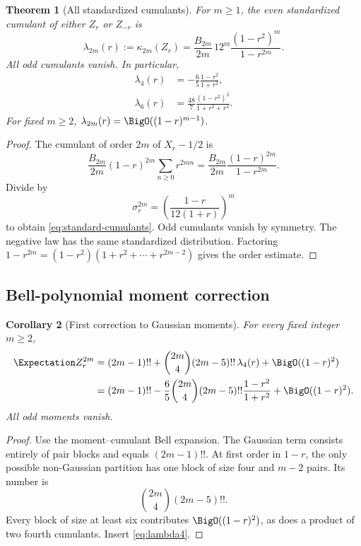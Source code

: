 \documentclass[11pt]{article}
\newtheorem{theorem}{Theorem}[section]
\newtheorem{corollary}[theorem]{Corollary}
\theoremstyle{definition}
\newcommand{\cump}{\kappa}
\begin{document}
\begin{theorem}[All standardized cumulants]\label{thm:standard-cumulants}
For \(m\ge1\), the even standardized cumulant of either \(Z_r\) or \(Z_{-r}\) is
\begin{equation}
 \boxed{
 \lambda_{2m}(r):=\cump_{2m}(Z_r)
 =\frac{B_{2m}}{2m}\,12^m
 \frac{(1-r^2)^m}{1-r^{2m}}.}                             \label{eq:standard-cumulants}
\end{equation}
All odd cumulants vanish.  In particular,
\begin{align}
 \lambda_4(r)&=-\frac65\frac{1-r^2}{1+r^2},              \label{eq:lambda4}\\
 \lambda_6(r)&=\frac{48}{7}
 \frac{(1-r^2)^2}{1+r^2+r^4}.                            \label{eq:lambda6}
\end{align}
For fixed \(m\ge2\), \(\lambda_{2m}(r)=\BigO((1-r)^{m-1})\).
\end{theorem}

\begin{proof}
The cumulant of order \(2m\) of \(X_r-1/2\) is
\[
 \frac{B_{2m}}{2m}(1-r)^{2m}\sum_{n\ge0}r^{2mn}
 =\frac{B_{2m}}{2m}\frac{(1-r)^{2m}}{1-r^{2m}}.
\]
Divide by
\[
 \sigma_r^{2m}=\left(\frac{1-r}{12(1+r)}\right)^m
\]
to obtain \cref{eq:standard-cumulants}.  Odd cumulants vanish by symmetry.  The
negative law has the same standardized distribution.  Factoring
\(1-r^{2m}=(1-r^2)(1+r^2+\cdots+r^{2m-2})\) gives the order estimate.
\end{proof}

\subsection{Bell-polynomial moment correction}

\begin{corollary}[First correction to Gaussian moments]\label{cor:moment-correction}
For every fixed integer \(m\ge2\),
\begin{align}
 \Expectation Z_r^{2m}
 &=(2m-1)!!
 +\binom{2m}{4}(2m-5)!!\,\lambda_4(r)
 +\BigO((1-r)^2)                                          \label{eq:moment-correction-1}\\
 &=(2m-1)!!
 -\frac65\binom{2m}{4}(2m-5)!!
  \frac{1-r^2}{1+r^2}
 +\BigO((1-r)^2).                                         \label{eq:moment-correction-2}
\end{align}
All odd moments vanish.
\end{corollary}

\begin{proof}
Use the moment--cumulant Bell expansion.  The Gaussian term consists entirely of pair
blocks and equals \((2m-1)!!\).  At first order in \(1-r\), the only possible
non-Gaussian partition has one block of size four and \(m-2\) pairs.  Its number is
\[
 \binom{2m}{4}(2m-5)!!.
\]
Every block of size at least six contributes \(\BigO((1-r)^2)\), as does a product of
two fourth cumulants.  Insert \cref{eq:lambda4}.
\end{proof}
\end{document}
